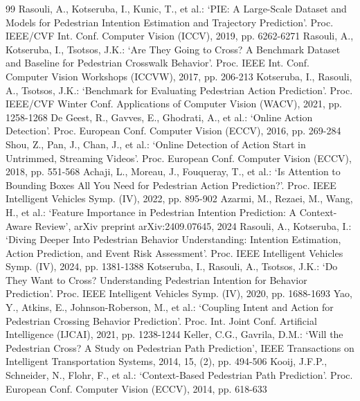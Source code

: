 \begin{thebibliography}{99}
 Rasouli, A., Kotseruba, I., Kunic, T., et al.: `PIE: A Large-Scale Dataset and Models for Pedestrian Intention Estimation and Trajectory Prediction'. Proc. IEEE/CVF Int. Conf. Computer Vision (ICCV), 2019, pp. 6262-6271
 Rasouli, A., Kotseruba, I., Tsotsos, J.K.: `Are They Going to Cross? A Benchmark Dataset and Baseline for Pedestrian Crosswalk Behavior'. Proc. IEEE Int. Conf. Computer Vision Workshops (ICCVW), 2017, pp. 206-213
 Kotseruba, I., Rasouli, A., Tsotsos, J.K.: `Benchmark for Evaluating Pedestrian Action Prediction'. Proc. IEEE/CVF Winter Conf. Applications of Computer Vision (WACV), 2021, pp. 1258-1268
 De Geest, R., Gavves, E., Ghodrati, A., et al.: `Online Action Detection'. Proc. European Conf. Computer Vision (ECCV), 2016, pp. 269-284
 Shou, Z., Pan, J., Chan, J., et al.: `Online Detection of Action Start in Untrimmed, Streaming Videos'. Proc. European Conf. Computer Vision (ECCV), 2018, pp. 551-568
 Achaji, L., Moreau, J., Fouqueray, T., et al.: `Is Attention to Bounding Boxes All You Need for Pedestrian Action Prediction?'. Proc. IEEE Intelligent Vehicles Symp. (IV), 2022, pp. 895-902
 Azarmi, M., Rezaei, M., Wang, H., et al.: `Feature Importance in Pedestrian Intention Prediction: A Context-Aware Review', arXiv preprint arXiv:2409.07645, 2024
 Rasouli, A., Kotseruba, I.: `Diving Deeper Into Pedestrian Behavior Understanding: Intention Estimation, Action Prediction, and Event Risk Assessment'. Proc. IEEE Intelligent Vehicles Symp. (IV), 2024, pp. 1381-1388
 Kotseruba, I., Rasouli, A., Tsotsos, J.K.: `Do They Want to Cross? Understanding Pedestrian Intention for Behavior Prediction'. Proc. IEEE Intelligent Vehicles Symp. (IV), 2020, pp. 1688-1693
 Yao, Y., Atkins, E., Johnson-Roberson, M., et al.: `Coupling Intent and Action for Pedestrian Crossing Behavior Prediction'. Proc. Int. Joint Conf. Artificial Intelligence (IJCAI), 2021, pp. 1238-1244
 Keller, C.G., Gavrila, D.M.: `Will the Pedestrian Cross? A Study on Pedestrian Path Prediction', IEEE Transactions on Intelligent Transportation Systems, 2014, 15, (2), pp. 494-506
 Kooij, J.F.P., Schneider, N., Flohr, F., et al.: `Context-Based Pedestrian Path Prediction'. Proc. European Conf. Computer Vision (ECCV), 2014, pp. 618-633

\end{thebibliography}
